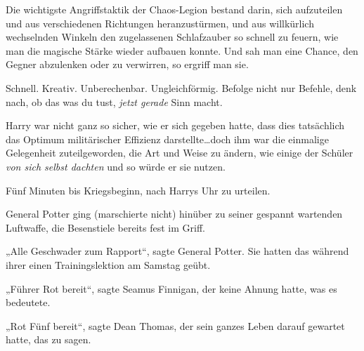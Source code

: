 Die wichtigste Angriffstaktik der Chaos-Legion bestand darin, sich aufzuteilen und aus verschiedenen Richtungen heranzustürmen, und aus willkürlich wechselnden Winkeln den zugelassenen Schlafzauber so schnell zu feuern, wie man die magische Stärke wieder aufbauen konnte. Und sah man eine Chance, den Gegner abzulenken oder zu verwirren, so ergriff man sie.

Schnell. Kreativ. Unberechenbar. Ungleichförmig. Befolge nicht nur Befehle, denk nach, ob das was du tust, \emph{jetzt gerade} Sinn macht.

Harry war nicht ganz so sicher, wie er sich gegeben hatte, dass dies tatsächlich das Optimum militärischer Effizienz darstellte…doch ihm war die einmalige Gelegenheit zuteilgeworden, die Art und Weise zu ändern, wie einige der Schüler \emph{von sich selbst dachten} und so würde er sie nutzen.

Fünf Minuten bis Kriegsbeginn, nach Harrys Uhr zu urteilen.

General Potter ging (marschierte nicht) hinüber zu seiner gespannt wartenden Luftwaffe, die Besenstiele bereits fest im Griff.

„Alle Geschwader zum Rapport“, sagte General Potter. Sie hatten das während ihrer einen Trainingslektion am Samstag geübt.

„Führer Rot bereit“, sagte Seamus Finnigan, der keine Ahnung hatte, was es bedeutete.

„Rot Fünf bereit“, sagte Dean Thomas, der sein ganzes Leben darauf gewartet hatte, das zu sagen.

